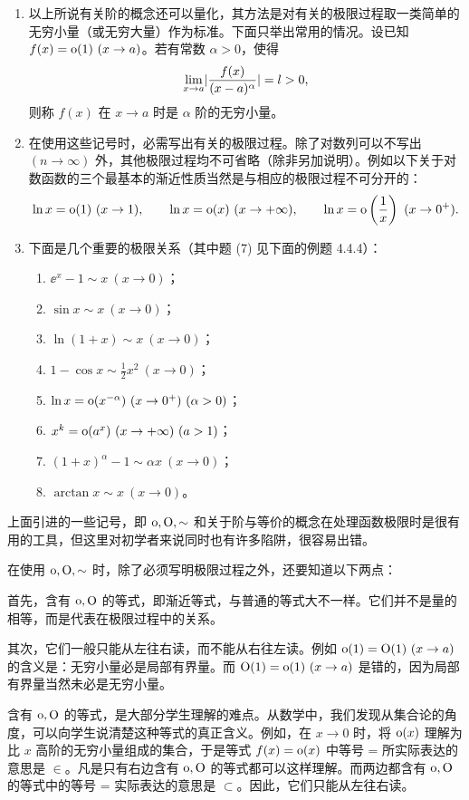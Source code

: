 \begin{enumerate}[start=7]
  \item 以上所说有关阶的概念还可以量化，其方法是对有关的极限过程取一类简单的无穷小量（或无穷大量）作为标准。下面只举出常用的情况。设已知 $f(x)=\mathrm{o}(1)\ (x\to a)$。若有常数 $\alpha>0$，使得
  \[
    \lim_{x\to a}\lvert\frac{f(x)}{(x-a)^\alpha}\rvert=l>0,
  \]
  则称 $f(x)$ 在 $x\to a$ 时是 $\alpha$ 阶的无穷小量。
  \item 在使用这些记号时，必需写出有关的极限过程。除了对数列可以不写出 $(n\to\infty)$ 外，其他极限过程均不可省略（除非另加说明）。例如以下关于对数函数的三个最基本的渐近性质当然是与相应的极限过程不可分开的：
  \[
    \ln x=\mathrm{o}(1)\ (x\to1),\qquad
    \ln x=\mathrm{o}(x)\ (x\to+\infty),\qquad
    \ln x=\mathrm{o}\left(\frac1x\right)\ (x\to0^+).
  \]
  \item 下面是几个重要的极限关系（其中题 (7) 见下面的例题 4.4.4）：
  \begin{enumerate}
    \item $\ee^x-1\sim x\ (x\to0)$；
    \item $\sin x\sim x\ (x\to0)$；
    \item $\ln(1+x)\sim x\ (x\to0)$；
    \item $1-\cos x\sim\frac12x^2\ (x\to0)$；
    \item $\ln x=\littleo(x^{-\alpha})\ (x\to0^+)\ (\alpha>0)$；
    \item $x^k=\littleo(a^x)\ (x\to+\infty)\ (a>1)$；
    \item $(1+x)^\alpha-1\sim\alpha x\ (x\to0)$；
    \item $\arctan x\sim x\ (x\to0)$。
  \end{enumerate}
\end{enumerate}

上面引进的一些记号，即 $\mathrm{o},\mathrm{O},\sim$ 和关于阶与等价的概念在处理函数极限时是很有用的工具，但这里对初学者来说同时也有许多陷阱，很容易出错。

在使用 $\mathrm{o},\mathrm{O},\sim$ 时，除了必须写明极限过程之外，还要知道以下两点：

首先，含有 $\mathrm{o},\mathrm{O}$ 的等式，即渐近等式，与普通的等式大不一样。它们并不是量的相等，而是代表在极限过程中的关系。

其次，它们一般只能从左往右读，而不能从右往左读。例如 $\mathrm{o}(1)=\mathrm{O}(1)\ (x\to a)$ 的含义是：无穷小量必是局部有界量。而 $\mathrm{O}(1)=\mathrm{o}(1)\ (x\to a)$ 是错的，因为局部有界量当然未必是无穷小量。

\begin{xremark}
含有 $\mathrm{o},\mathrm{O}$ 的等式，是大部分学生理解的难点。从数学中，我们发现从集合论的角度，可以向学生说清楚这种等式的真正含义。例如，在 $x\to0$ 时，将 $\mathrm{o}(x)$ 理解为比 $x$ 高阶的无穷小量组成的集合，于是等式 $f(x)=\mathrm{o}(x)$ 中等号 = 所实际表达的意思是 $\in$。凡是只有右边含有 $\mathrm{o},\mathrm{O}$ 的等式都可以这样理解。而两边都含有 $\mathrm{o},\mathrm{O}$ 的等式中的等号 = 实际表达的意思是 $\subset$。因此，它们只能从左往右读。
\end{xremark}


